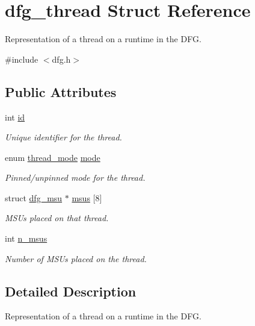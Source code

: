 \hypertarget{structdfg__thread}{\section{dfg\-\_\-thread Struct Reference}
\label{structdfg__thread}
}


Representation of a thread on a runtime in the D\-F\-G.  




{\ttfamily \#include $<$dfg.\-h$>$}

\subsection*{Public Attributes}
\begin{DoxyCompactItemize}
\item 
int \hyperlink{structdfg__thread_a1f44ee61a43ca981d995f3bccd2a2ae9}{id}
\begin{DoxyCompactList}\small\item\em Unique identifier for the thread. \end{DoxyCompactList}\item 
enum \hyperlink{dfg_8h_a673ccd9aadafd31e8beaf16423c07db2}{thread\-\_\-mode} \hyperlink{structdfg__thread_a38d082c617509a7343088e1f6db9becd}{mode}
\begin{DoxyCompactList}\small\item\em Pinned/unpinned mode for the thread. \end{DoxyCompactList}\item 
struct \hyperlink{structdfg__msu}{dfg\-\_\-msu} $\ast$ \hyperlink{structdfg__thread_a31973f7c62c54be9c6fb0c6ad1c7609e}{msus} \mbox{[}8\mbox{]}
\begin{DoxyCompactList}\small\item\em M\-S\-Us placed on that thread. \end{DoxyCompactList}\item 
int \hyperlink{structdfg__thread_a2111899465e37d56cdf83654e280aa82}{n\-\_\-msus}
\begin{DoxyCompactList}\small\item\em Number of M\-S\-Us placed on the thread. \end{DoxyCompactList}\end{DoxyCompactItemize}


\subsection{Detailed Description}
Representation of a thread on a runtime in the D\-F\-G. 

